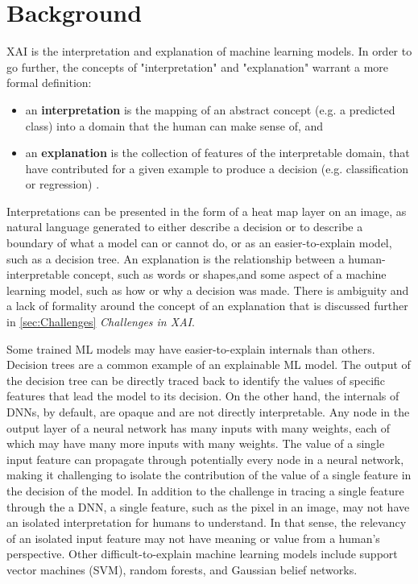 \section{Background}

XAI is the interpretation and explanation of machine learning models.  In order to go further, the concepts of "interpretation" and "explanation" warrant a more formal definition:

\begin{itemize}
    \item an \textbf{interpretation} is the mapping of an abstract concept (e.g. a predicted class) into a domain that the human can make sense of, and
    \item an \textbf{explanation} is the collection of features of the interpretable domain, that have contributed for a given example to produce a decision (e.g. classification or regression) \cite{MONTAVON20181}.
\end{itemize}

Interpretations can be presented in the form of a heat map layer on an image, as natural language generated to either describe a decision or to describe a boundary of what a model can or cannot do, or as an easier-to-explain model, such as a decision tree.  An explanation is the relationship between a human-interpretable concept, such as words or shapes,and some aspect of a machine learning model, such as how or why a decision was made.  There is ambiguity and a lack of formality around the concept of an explanation that is discussed further in \ref{sec:Challenges} \textit{Challenges in XAI}.

Some trained ML models may have easier-to-explain internals than others.  Decision trees are a common example of an explainable ML model.  The output of the decision tree can be directly traced back to identify the values of specific features that lead the model to its decision.  On the other hand, the internals of DNNs, by default, are opaque and are not directly interpretable.  Any node in the output layer of a neural network has many inputs with many weights, each of which may have many more inputs with many weights.  The value of a single input feature can propagate through potentially every node in a neural network, making it challenging to isolate the contribution of the value of a single feature in the decision of the model.  In addition to the challenge in tracing a single feature through the a DNN, a single feature, such as the pixel in an image, may not have an isolated interpretation for humans to understand.  In that sense, the relevancy of an isolated input feature may not have meaning or value from a human's perspective.  Other difficult-to-explain machine learning models include support vector machines (SVM), random forests, and Gaussian belief networks.

